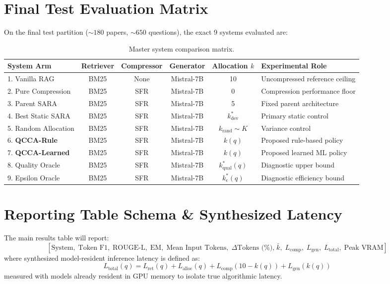 \documentclass[11pt,a4paper]{article}
\begin{document}
\section{Final Test Evaluation Matrix}
On the final test partition ($\sim 180$ papers, $\sim 650$ questions), the exact 9 systems evaluated are:
\begin{table}[h]
\centering
\small
\begin{tabularx}{\textwidth}{lccccX}
\toprule
\textbf{System Arm} & \textbf{Retriever} & \textbf{Compressor} & \textbf{Generator} & \textbf{Allocation $k$} & \textbf{Experimental Role} \\
\midrule
1. Vanilla RAG & BM25 & None & Mistral-7B & 10 & Uncompressed reference ceiling \\
2. Pure Compression & BM25 & SFR & Mistral-7B & 0 & Compression performance floor \\
3. Parent SARA & BM25 & SFR & Mistral-7B & 5 & Fixed parent architecture \\
4. Best Static SARA & BM25 & SFR & Mistral-7B & $k_{\text{dev}}^*$ & Primary static control \\
5. Random Allocation & BM25 & SFR & Mistral-7B & $k_{\text{rand}} \sim K$ & Variance control \\
6. \textbf{QCCA-Rule} & BM25 & SFR & Mistral-7B & $k(q)$ & Proposed rule-based policy \\
7. \textbf{QCCA-Learned} & BM25 & SFR & Mistral-7B & $k(q)$ & Proposed learned ML policy \\
8. Quality Oracle & BM25 & SFR & Mistral-7B & $k^*_{\text{qual}}(q)$ & Diagnostic upper bound \\
9. Epsilon Oracle & BM25 & SFR & Mistral-7B & $k^*_{\epsilon}(q)$ & Diagnostic efficiency bound \\
\bottomrule
\end{tabularx}
\caption{Master system comparison matrix.}
\end{table}

\section{Reporting Table Schema \& Synthesized Latency}
The main results table will report:
\begin{equation*}
\left[ \text{System}, \; \text{Token F1}, \; \text{ROUGE-L}, \; \text{EM}, \; \text{Mean Input Tokens}, \; \Delta\text{Tokens (\%),} \; \bar{k}, \; L_{\text{comp}}, \; L_{\text{gen}}, \; L_{\text{total}}, \; \text{Peak VRAM} \right]
\end{equation*}
where synthesized model-resident inference latency is defined as:
\begin{equation}
L_{\text{total}}(q) = L_{\text{ret}}(q) + L_{\text{alloc}}(q) + L_{\text{comp}}(10 - k(q)) + L_{\text{gen}}(k(q))
\end{equation}
measured with models already resident in GPU memory to isolate true algorithmic latency.
\end{document}
